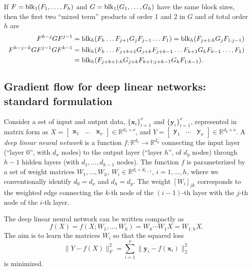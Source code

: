 \documentclass{article}
\def\block{{\rm blk}}
\newcommand{\1}{\mathds{1}}
\begin{document}
If $ F=\block_1(F_1, \ldots, F_h) $ and $ G=\block_1(G_1, \ldots, G_h) $ have the same block sizes, then the first two ``mixed term'' products of order 1 and 2 in $G$ and of total order $h$ are
\begin{align}
F^{h-j} G F^{j-1} & = \block_h(F_h \ldots F_{j+1} G_{j} F_{j-1} \ldots F_1) = \block_h(F_{j+1:h}  G_{j} F_{1:j-1})
\label{eq:FGF} \\
F^{h-j-k} G F^{j-1} G F^{k-1} & = \block_h(F_h \ldots F_{j+k+1} G_{j+k} F_{j+k-1} \ldots F_{k+1} G_{k} F_{k-1} \ldots, F_1) \label{eq:FGFGF} \\
& = \block_h(F_{j+k+1:h}  G_{j+k} F_{k+1: j+k-1}G_{k} F_{1: k-1} ).
\nonumber 
\end{align}

\subsection{Gradient flow for deep linear networks: standard formulation}
\label{sec:grad-flow-basic}

Consider a set of input and output data, $\{\mathbf{x}_i\}^\nu_{i=1}$ and $\{\mathbf{y}_i\}^\nu_{i=1}$, represented in matrix form as $X=\begin{bmatrix}
    \mathbf{x}_1 & ... & \mathbf{x}_\nu
\end{bmatrix}\in\mathbb{R}^{d_x\times \nu}$, and $Y=\begin{bmatrix}
    \mathbf{y}_1 & ... & \mathbf{y}_\nu
\end{bmatrix}\in\mathbb{R}^{d_y\times \nu}$.
A {\em deep linear neural network} is a function $f:\mathbb{R}^{d_x}\rightarrow\mathbb{R}^{d_y}$ connecting the input layer (``layer 0'', with $ d_x$ nodes) to the output layer (``layer $h$'', of $ d_y $ nodes) through $ h-1$ hidden layers (with $ d_1, \ldots, d_{h-1}$ nodes). 
The function $ f$ is parameterized by a set of weight matrices $W_1,...,W_h$,  $W_i\in\mathbb{R}^{d_i\times d_{i-1}} $, $ i=1, \ldots, h$, where we conventionally identify $ d_0= d_x $ and $ d_h=d_y $.
The weight $ [W_i]_{jk}$ corresponds to the weighted edge connecting the $k$-th node of the $ (i-1)$-th layer with the $j$-th node of the $i$-th layer. 


The  deep linear neural network can be written compactly as
\begin{equation}
\label{eq:prodW}
    f(X)=f(X;W_1,...,W_h) = W_h\cdots W_1 X = W_{1:h} X.
\end{equation}
The aim is to learn the matrices $W_i$ so that the squared loss
\begin{equation}\label{eq:orig_loss}
    \lVert Y-f(X)\rVert_F^2 = \sum_{i=1}^\nu \lVert \mathbf{y}_i-f(\mathbf{x}_i)\rVert_2^2
\end{equation}
is minimized. 
\end{document}
